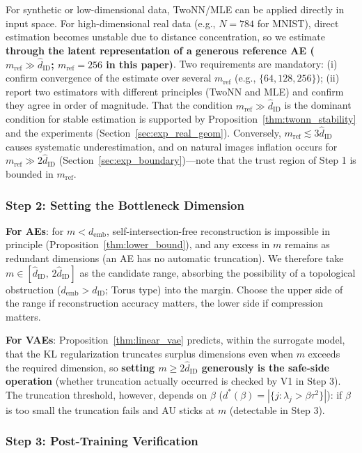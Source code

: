 \documentclass[make,article,submit,pdftex,moreauthors]{Definitions/mdpi}
\newcommand{\dID}{d_{\mathrm{ID}}}
\newcommand{\hatdID}{\hat{d}_{\mathrm{ID}}}
\newcommand{\demb}{d_{\mathrm{emb}}}
\newcommand{\dstar}{d^{*}(\beta)}
\begin{document}
For synthetic or low-dimensional data, TwoNN/MLE can be applied directly in
input space.
For high-dimensional real data (e.g., $N = 784$ for MNIST), direct
estimation becomes unstable due to distance concentration, so we estimate
\textbf{through the latent representation of a generous reference AE
($m_{\mathrm{ref}} \gg \hatdID$; $m_{\mathrm{ref}} = 256$ in this paper)}.
Two requirements are mandatory:
(i) confirm convergence of the estimate over several $m_{\mathrm{ref}}$
(e.g., $\{64, 128, 256\}$);
(ii) report two estimators with different principles (TwoNN and MLE) and
confirm they agree in order of magnitude.
That the condition $m_{\mathrm{ref}} \gg \hatdID$ is the dominant condition
for stable estimation is supported by
Proposition~\ref{thm:twonn_stability} and the experiments
(Section~\ref{sec:exp_real_geom}).
Conversely, $m_{\mathrm{ref}} \lesssim 3\hatdID$ causes systematic
underestimation, and on natural images inflation occurs for
$m_{\mathrm{ref}} \gg 2\hatdID$ (Section~\ref{sec:exp_boundary})---note that
the trust region of Step 1 is bounded in $m_{\mathrm{ref}}$.

\subsubsection{Step 2: Setting the Bottleneck Dimension}\label{sec:protocol_s2}

\textbf{For AEs}: for $m < \demb$, self-intersection-free reconstruction is
impossible in principle (Proposition~\ref{thm:lower_bound}), and any excess
in $m$ remains as redundant dimensions (an AE has no automatic truncation).
We therefore take $m \in [\hatdID,\, 2\hatdID]$ as the candidate range,
absorbing the possibility of a topological obstruction
($\demb > \dID$; Torus type) into the margin.
Choose the upper side of the range if reconstruction accuracy matters, the
lower side if compression matters.

\textbf{For VAEs}: Proposition~\ref{thm:linear_vae} predicts, within the
surrogate model, that the KL regularization truncates surplus dimensions
even when $m$ exceeds the required dimension, so
\textbf{setting $m \geq 2\hatdID$ generously is the safe-side operation}
(whether truncation actually occurred is checked by V1 in Step 3).
The truncation threshold, however, depends on $\beta$
($\dstar = |\{j : \lambda_j > \beta\tau^2\}|$): if $\beta$ is too small the
truncation fails and AU sticks at $m$ (detectable in Step 3).

\subsubsection{Step 3: Post-Training Verification}\label{sec:protocol_s3}
\end{document}
